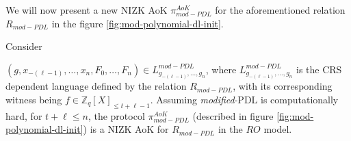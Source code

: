 We will now present a new NIZK AoK $\pi_{mod-PDL}^{AoK}$ for the aforementioned relation 
$R_{mod-PDL}$ in the figure \ref{fig:mod-polynomial-dl-init}.



\begin{theorem}\label{th:modified_PDL security}
  Consider\par $(g,x_{-(\ell-1)},\dots,x_n,F_0,\dots,F_n)\in L_{g_{-(\ell-1)},\dots,g_n}^{mod-PDL}$, where 
  $L_{g_{-(\ell-1)},\dots,g_n}^{mod-PDL}$ is the CRS dependent language defined by the relation 
  $R_{mod-PDL}$,
  with its corresponding witness being $f\in\mathbb{Z}_q[X]_{\leq t+\ell-1}$.
  Assuming \textit{modified}-PDL is computationally hard, for 
  $t+\ell\leq n$, the protocol $\pi_{mod-PDL}^{AoK}$ (described in figure \ref{fig:mod-polynomial-dl-init}) is a 
  NIZK AoK for $R_{mod-PDL}$ in the $RO$ model.
\end{theorem}
